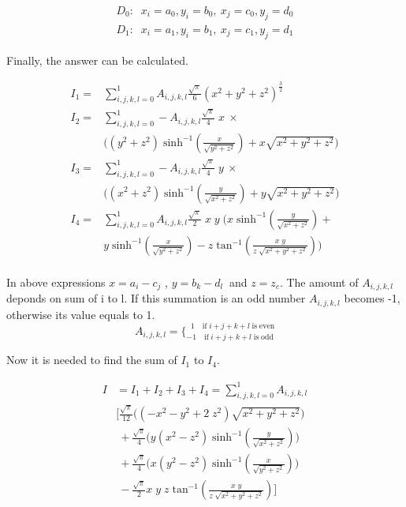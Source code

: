 \documentclass[final,5p,times,twocolumn]{elsarticle}
\begin{document}
\begin{equation}\label {eq14}
\begin{split}
D_0:\;\;x_i=a_0, y_i = b_0,\ x_j = c_0,y_j = d_0\\
D_1:\;\;x_i=a_1, y_i = b_1, \ x_j = c_1,y_j = d_1
\end{split}
\end{equation}

Finally, the answer can be calculated.

\begin{equation}\label {eq15}
\begin{split}
I_1 = &\sum_{i,j,k,l=0}^1 A_{i,j,k,l}\frac {\sqrt{\pi} } {6} (x^2+y^2+z^2)^{\frac 3 2}\\
I_2 = &\sum_{i,j,k,l=0}^1 -A_{i,j,k,l}\frac {\sqrt{\pi} } {4}\;x\ \times \\
&\Bigg((y^2 + z^2) \;\mathrm{sinh^{-1}}(\frac{x}{\sqrt{y^2 + z^2}}) +x \sqrt{x^2 + y^2 + z^2}\Bigg)\\ 
I_3 = &\sum_{i,j,k,l=0}^1 -A_{i,j,k,l}\frac {\sqrt{\pi} } {4}\;y\ \times \\
&\Bigg((x^2 + z^2)\;\mathrm{sinh^{-1}}(\frac{y}{\sqrt{x^2 + z^2}}) +y \sqrt{x^2 + y^2 + z^2}\Bigg) \\ 
I_4 = &\sum_{i,j,k,l=0}^1 A_{i,j,k,l}\frac {\sqrt{\pi} } {2}\;x\;y\; \Bigg(x\;\mathrm{sinh^{-1}}(\frac{y}{\sqrt{x^2 + z^2}})+ \\
 &y\;\mathrm{sinh^{-1}}(\frac{x}{\sqrt{y^2 + z^2}}) -z\;\mathrm{tan^{-1}}(\frac{x\;y}{z\;\sqrt{x^2+y^2 + z^2}}) \Bigg)\\ 
\end{split}
\end{equation}

In above expressions $x = a_i - c_j$ , $y = b_k - d_l\ $ and $z = z_c$. The amount of $A_{i,j,k,l}$ deponds on sum of i to l. If this summation is an odd number $A_{i,j,k,l}$ becomes -1, otherwise its value equals to 1.
\begin{equation}\label{eq16}
A_{i,j,k,l} = \Big\{^{\;\;1\quad  \mathrm{if}\; i + j + k + l\; \mathrm{is \;even}}_{-1\quad  \mathrm{if}\; i + j + k + l\; \mathrm{is \;odd}}
\end{equation}

Now it is needed to find the sum of $I_1$ to $I_4$.

\begin{equation}\label {eq:17}
\begin{split}
I&=I_1+I_2+I_3+I_4 = \sum_{i,j,k,l=0}^1 A_{i,j,k,l}\\
&  \bigg[ \frac {\sqrt{\pi} } {12} \Big((-x^2-y^2+2\;z^2)\sqrt{x^2 + y^2 + z^2} \Big) \\
& \ +  \frac {\sqrt{\pi} } {4} \Big( y(x^2 - z^2)\;\mathrm{sinh^{-1}}(\frac{y}{\sqrt{x^2 + z^2}}) \Big)\\
&\ +   \frac {\sqrt{\pi} } {4}\Big( x(y^2-z^2)\;\mathrm{sinh^{-1}}(\frac{x}{\sqrt{y^2 + z^2}})  \Big)\\ 
&\ -  \frac {\sqrt{\pi} } {2}x \;y\;z\;\mathrm{tan^{-1}}(\frac{x\;y}{z\;\sqrt{x^2+y^2 + z^2}})\bigg]
\end{split}
\end{equation}
\end{document}
